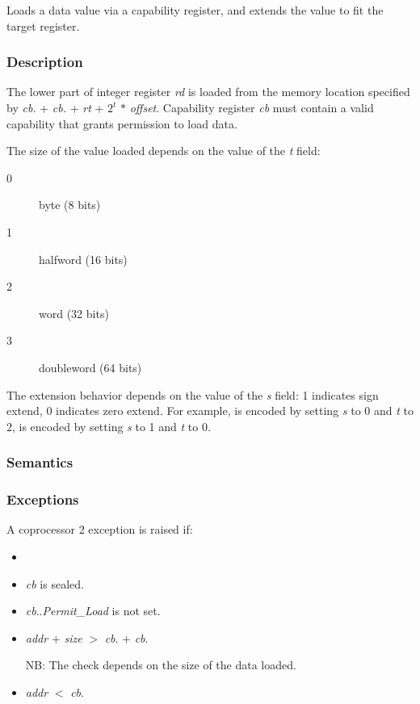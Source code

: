 Loads a data value via a capability register, and extends the value to fit the target register.

\subsubsection*{Description}

The lower part of integer register \emph{rd} is loaded from the memory
location specified by \emph{cb.\cbase{}} + \emph{cb.\coffset{}} + \emph{rt} +
$2^t$ $*$  \emph{offset}. Capability register \emph{cb} must
contain a valid capability that grants permission to load data.

The size of the value loaded depends on the value of the \emph{t} field:

\begin{description}
	\item[0] byte (8 bits)
	\item[1] halfword (16 bits)
	\item[2] word (32 bits)
	\item[3] doubleword (64 bits)
\end{description}

The extension behavior depends on the value of the \emph{s} field: 1 indicates sign extend, 0 indicates zero extend.  For example,  is encoded by setting \emph{s} to 0 and \emph{t} to 2,  is encoded by setting \emph{s} to 1 and
\emph{t} to 0.

\subsubsection*{Semantics}

\subsubsection*{Exceptions}

A coprocessor 2 exception is raised if:

\begin{itemize}
\item
\cchecktag{}
\item
\emph{cb} is sealed.
\item
\emph{cb}.\cperms.\emph{Permit\_Load} is not set.
\item
\emph{addr} $+$ \emph{size} $>$ \emph{cb}.\cbase{} $+$ \emph{cb}.\clength{}

NB: The check depends on the size of the data loaded.
\item
\emph{addr} $<$ \emph{cb}.\cbase{}
\end{itemize}

